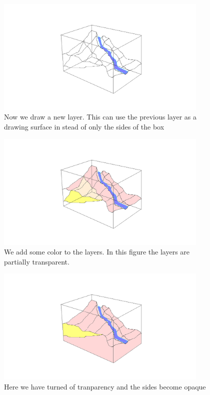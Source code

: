 \documentclass[12pt,a4paper]{article}
\begin{document}
\begin{figure}
\centering
\includegraphics[width=4in]{drawNewLayer}
\caption[]{
  \footnotesize
  Now we draw a new layer. This can use the previous layer as a drawing surface in stead of only the sides of the box
  \label{fig:drawNewLayer}
}
\end{figure}

\begin{figure}
\centering
\includegraphics[width=4in]{addColor}
\caption[]{
  \footnotesize
  We add some color to the layers. In this figure the layers are partially transparent.
  \label{fig:addColor}
}
\end{figure}

\begin{figure}
\centering
\includegraphics[width=4in]{offTransparency}
\caption[]{
  \footnotesize
  Here we have turned of tranparency and the sides become opaque
  \label{fig:offTransparency}
}
\end{figure}
\end{document}

